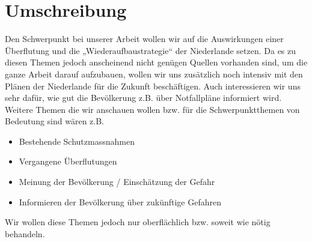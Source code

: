 \part{Umschreibung}
 
\textnormal 
{Den Schwerpunkt bei unserer Arbeit wollen wir auf die Auswirkungen 
einer Überflutung und die „Wiederaufbaustrategie“ der Niederlande setzen. 
Da es zu diesen Themen jedoch anscheinend nicht genügen Quellen vorhanden sind, 
um die ganze Arbeit darauf aufzubauen, wollen wir uns zusätzlich noch intensiv mit 
den Plänen der Niederlande für die Zukunft beschäftigen. Auch interessieren wir uns 
sehr dafür, wie gut die Bevölkerung z.B. über Notfallpläne informiert wird. 
Weitere Themen die wir anschauen wollen bzw. für die Schwerpunktthemen von 
Bedeutung sind wären z.B.}
 
\begin{itemize}  
\item Bestehende Schutzmassnahmen
\item Vergangene Überflutungen
\item Meinung der Bevölkerung / Einschätzung der Gefahr
\item Informieren der Bevölkerung über zukünftige Gefahren
\end{itemize}    

\textnormal
{Wir wollen diese Themen jedoch nur oberflächlich bzw. soweit wie 
nötig behandeln.}
